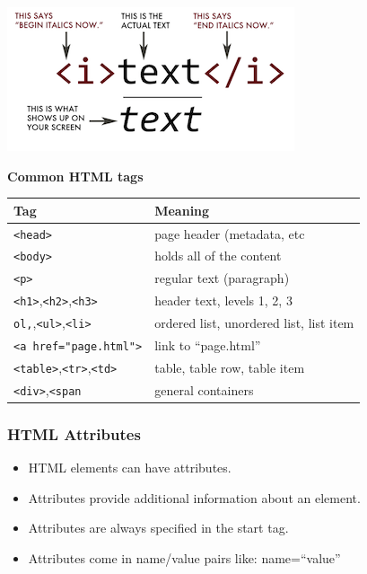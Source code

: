 \documentclass[]{book}
\providecommand{\tightlist}{%
  \setlength{\itemsep}{0pt}\setlength{\parskip}{0pt}}
\begin{document}
\begin{center}\includegraphics[width=0.7\linewidth]{img/html-tags} \end{center}

\textbf{Common HTML tags}

\begin{longtable}[]{@{}ll@{}}
\toprule
Tag & Meaning\tabularnewline
\midrule
\endhead
\texttt{\textless{}head\textgreater{}} & page header (metadata,
etc\tabularnewline
\texttt{\textless{}body\textgreater{}} & holds all of the
content\tabularnewline
\texttt{\textless{}p\textgreater{}} & regular text
(paragraph)\tabularnewline
\texttt{\textless{}h1\textgreater{}},\texttt{\textless{}h2\textgreater{}},\texttt{\textless{}h3\textgreater{}}
& header text, levels 1, 2, 3\tabularnewline
\texttt{ol,},\texttt{\textless{}ul\textgreater{}},\texttt{\textless{}li\textgreater{}}
& ordered list, unordered list, list item\tabularnewline
\texttt{\textless{}a\ href="page.html"\textgreater{}} & link to
``page.html''\tabularnewline
\texttt{\textless{}table\textgreater{}},\texttt{\textless{}tr\textgreater{}},\texttt{\textless{}td\textgreater{}}
& table, table row, table item\tabularnewline
\texttt{\textless{}div\textgreater{}},\texttt{\textless{}span} & general
containers\tabularnewline
\bottomrule
\end{longtable}

\subsubsection*{HTML Attributes}\label{html-attributes}

\begin{itemize}
\tightlist
\item
  HTML elements can have attributes.
\item
  Attributes provide additional information about an element.
\item
  Attributes are always specified in the start tag.
\item
  Attributes come in name/value pairs like: name=``value''
\end{itemize}
\end{document}
